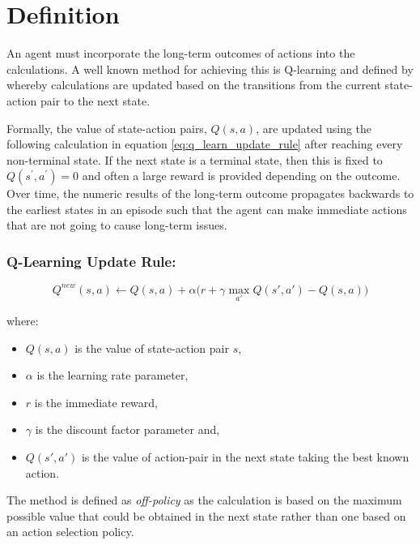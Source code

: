 \documentclass{article}
\title{}
\begin{document}
\maketitle
\section{Definition}
\label{loc:definition}
An agent must incorporate the long-term outcomes of actions into the calculations. A well known method for achieving this is Q-learning and defined by \cite{suttonReinforcementLearningIntroduction2018} whereby calculations are updated based on the transitions from the current state-action pair to the next state.

Formally, the value of state-action pairs, $Q(s,a)$, are updated using the following calculation in equation \autoref{eq:q_learn_update_rule} after reaching every non-terminal state. If the next state is a terminal state, then this is fixed to $Q(s^\prime,a^\prime)=0$ and often a large reward is provided depending on the outcome. Over time, the numeric results of the long-term outcome propagates backwards to the earliest states in an episode such that the agent can make immediate actions that are not going to cause long-term issues. 
\subsubsection{Q-Learning Update Rule:}
\label{loc:definition.q:learning_update_rule:}
\begin{equation}
\label{eq:q_learn_update_rule}
Q^{new}(s,a)\leftarrow Q(s,a) + \alpha {\bigg (} r + \gamma \max_{a'}Q(s',a') - Q(s,a) {\bigg )}
\end{equation}

where:
\begin{itemize}
\item $Q(s,a)$ is the value of state-action pair $s$,
\item $\alpha$ is the learning rate parameter,
\item $r$ is the immediate reward,
\item $\gamma$ is the discount factor parameter and,
\item $Q(s', a')$ is the value of action-pair in the next state taking the best known action.
\end{itemize}

The method is defined as \emph{off-policy} as the calculation is based on the maximum possible value that could be obtained in the next state rather than one based on an action selection policy. 
\printbibliography
\end{document}
